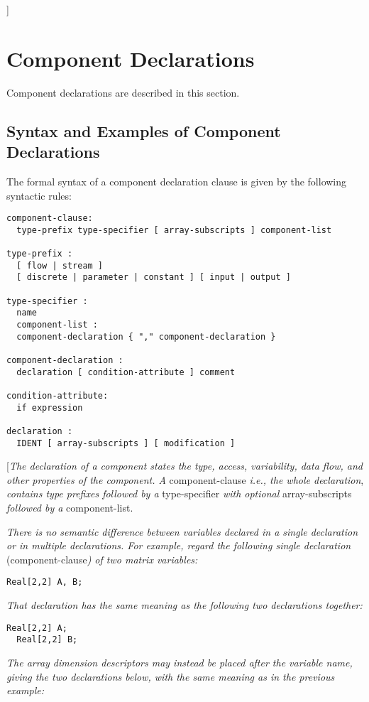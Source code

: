 {]}

\section{Component Declarations}

Component declarations are described in this section.

\subsection{Syntax and Examples of Component Declarations}

The formal syntax of a component declaration clause is given by the
following syntactic rules:

\begin{lstlisting}[language=grammar]
component-clause:
  type-prefix type-specifier [ array-subscripts ] component-list
  
type-prefix :
  [ flow | stream ]
  [ discrete | parameter | constant ] [ input | output ]
  
type-specifier :
  name
  component-list :
  component-declaration { "," component-declaration }
  
component-declaration :
  declaration [ condition-attribute ] comment
  
condition-attribute:
  if expression
  
declaration :
  IDENT [ array-subscripts ] [ modification ]
\end{lstlisting}

{[}\emph{The declaration of a component states the type, access,
variability, data flow, and other properties of the component. A}
component-clause \emph{i.e., the whole declaration}, \emph{contains type
prefixes followed by a} type-specifier \emph{with optional}
array-subscripts \emph{followed by a} component-list.

\emph{There is no semantic difference between variables declared in a
single declaration or in multiple declarations. For example, regard the
following single declaration} (component-clause\emph{) of two matrix
variables:}

\begin{lstlisting}[language=modelica]
  Real[2,2] A, B;
\end{lstlisting}
\emph{That declaration has the same meaning as the following two
declarations together:}

\begin{lstlisting}[language=modelica]
  Real[2,2] A;
  Real[2,2] B;
\end{lstlisting}
\emph{The array dimension descriptors may instead be placed after the
variable name, giving the two declarations below, with the same meaning
as in the previous example:}


